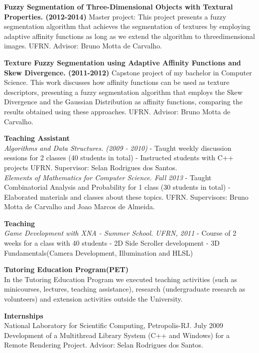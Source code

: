 \documentclass[letterpaper]{article}
\renewenvironment{itemize}{
  \begin{list}{}{
      \setlength{\leftmargin}{1.5em}
    }
  }{
  \end{list}
}
\begin{document}
\begin{itemize}
  \item[$\bullet$] \textbf{Fuzzy Segmentation of Three-Dimensional Objects with Textural Properties. (2012-2014)}
  Master project: This project presents a fuzzy segmentation algorithm that achieves the segmentation
  of textures by employing adaptive affinity functions as long as we extend the algorithm to threedimensional
  images.
  UFRN. Advisor: Bruno Motta de Carvalho.

  \item[$\bullet$] \textbf{Texture Fuzzy Segmentation using Adaptive Affinity Functions and Skew Divergence. (2011-2012)}
  Capstone project of my bachelor in Computer Science. This work discusses how affinity functions
  can be used as texture descriptors, presenting a fuzzy segmentation algorithm that employs the Skew
  Divergence and the Gaussian Distribution as affinity functions, comparing the results obtained using
  these approaches.
  UFRN. Advisor: Bruno Motta de Carvalho.

  \item[$\bullet$] \textbf{Teaching Assistant}\\
  
  \textit{Algorithms and Data Structures. (2009 - 2010)}
  - Taught weekly discussion sessions for 2 classes (40 students in total)
  - Instructed students with C++ projects
  UFRN. Supervisor: Selan Rodrigues dos Santos.\\
  
  \textit{Elements of Mathematics for Computer Science. Fall 2013}
  - Taught Combinatorial Analysis and Probability for 1 class (30 students in total)
  - Elaborated materials and classes about these topics.
  UFRN. Supervisors: Bruno Motta de Carvalho and Joao Marcos de Almeida. 
  
  \item[$\bullet$] \textbf{Teaching}\\
  
  \textit{Game Development with XNA - Summer School. UFRN, 2011}
  - Course of 2 weeks for a class with 40 students
  - 2D Side Scroller development
  - 3D Fundamentals(Camera Development, Illumination and HLSL)\\
  
  \item[$\bullet$] \textbf{Tutoring Education Program(PET)}\\
  
  In the Tutoring Education Program we executed teaching activities (such as minicourses, lectures, teaching assistance), research (undergraduate research as volunteers) and extension activities outside the University. \\
  
  \item[$\bullet$] \textbf{Internships}\\
  
  National Laboratory for Scientific Computing, Petropolis-RJ. July 2009
  Development of a Multithread Library System (C++ and Windows) for a Remote Rendering Project. Advisor: Selan Rodrigues dos Santos.
 
\end{itemize}
\end{document}
